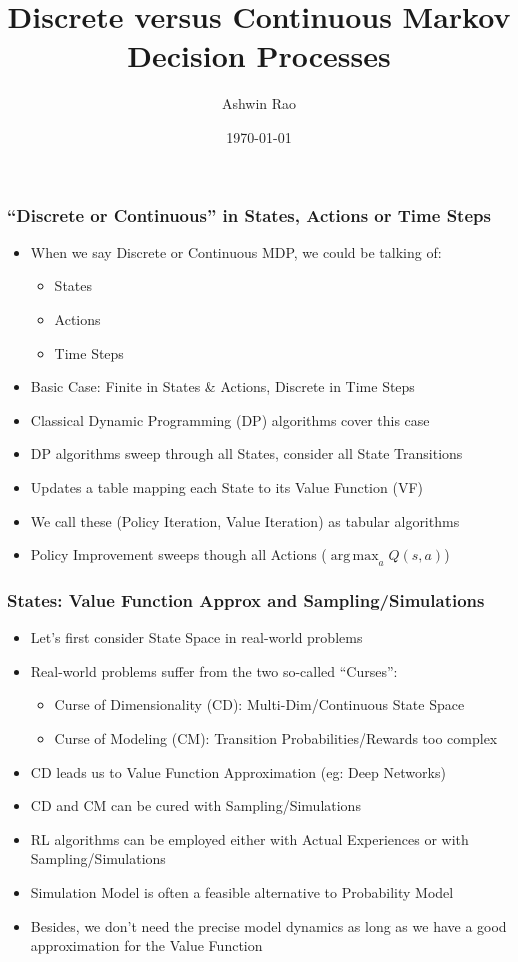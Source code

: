 \documentclass[handout]{beamer}
\title[Discrete versus Continuous MDPs]{Discrete versus Continuous Markov Decision Processes} %
\author{Ashwin Rao} %
\institute[Stanford] %
{
ICME, Stanford University
}
\date{\today} %
\DeclareMathOperator*{\argmax}{arg\,max}
\begin{document}
\begin{frame}
\titlepage %
\end{frame}


\begin{frame}
\frametitle{``Discrete or Continuous'' in States, Actions or Time Steps}
\pause
\begin{itemize}[<+->]
\item When we say Discrete or Continuous MDP, we could be talking of:
\begin{itemize}
\item States
\item Actions
\item Time Steps
\end{itemize}
\item Basic Case: Finite in States \& Actions, Discrete in Time Steps
\item Classical Dynamic Programming (DP) algorithms cover this case
\item DP algorithms sweep through all States, consider all State Transitions
\item Updates a table mapping each State to its Value Function (VF)
\item We call these (Policy Iteration, Value Iteration) as tabular algorithms
\item Policy Improvement sweeps though all Actions ($\argmax_a Q(s,a)$)
\end{itemize}
\end{frame}

\begin{frame}
\frametitle{States: Value Function Approx and Sampling/Simulations}
\pause
\begin{itemize}[<+->]
\item Let's first consider State Space in real-world problems
\item Real-world problems suffer from the two so-called ``Curses'':
\begin{itemize}
\item Curse of Dimensionality (CD): Multi-Dim/Continuous State Space
\item Curse of Modeling (CM): Transition Probabilities/Rewards too complex
\end{itemize}
\item CD leads us to Value Function Approximation (eg: Deep Networks)
\item CD and CM can be cured with Sampling/Simulations
\item RL algorithms can be employed either with Actual Experiences or with Sampling/Simulations
\item Simulation Model is often a feasible alternative to Probability Model
\item Besides, we don't need the precise model dynamics as long as we have a good approximation for the Value Function
\end{itemize}
\end{frame}
\end{document}
